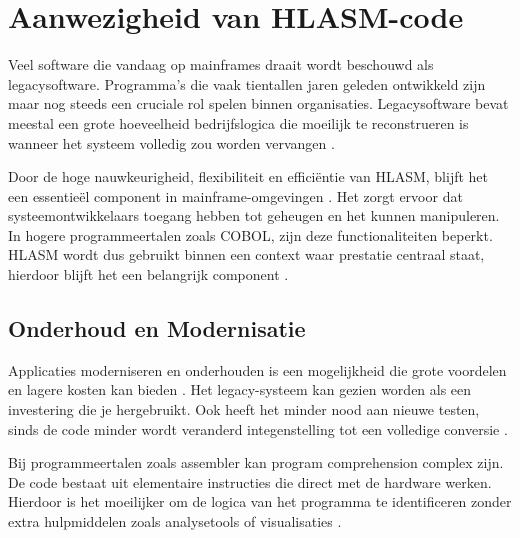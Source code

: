 

\section{Aanwezigheid van HLASM-code}

Veel software die vandaag op mainframes draait wordt beschouwd als legacysoftware. Programma's die vaak tientallen jaren geleden ontwikkeld zijn maar nog steeds een cruciale rol spelen binnen organisaties. Legacysoftware bevat meestal een grote hoeveelheid bedrijfslogica die moeilijk te reconstrueren is wanneer het systeem volledig zou worden vervangen \autocite{sneed_verhoef_2019}. 

Door de hoge nauwkeurigheid, flexibiliteit en efficiëntie van HLASM, blijft het een essentieël component in mainframe-omgevingen \autocite{yalamanchili_2022}. Het zorgt ervoor dat systeemontwikkelaars toegang hebben tot geheugen en het kunnen manipuleren. In hogere programmeertalen zoals COBOL, zijn deze functionaliteiten beperkt. HLASM wordt dus gebruikt binnen een context waar prestatie centraal staat, hierdoor blijft het een belangrijk component \autocite{yalamanchili_2022}. 


\subsection{Onderhoud en Modernisatie}

Applicaties moderniseren en onderhouden is een mogelijkheid die grote voordelen en lagere kosten kan bieden \autocite{ehrman_2004}. Het legacy-systeem kan gezien worden als een investering die je hergebruikt. Ook heeft het minder nood aan nieuwe testen, sinds de code minder wordt veranderd integenstelling tot een volledige conversie \autocite{ehrman_2004}.  

Bij programmeertalen zoals assembler kan program comprehension complex zijn. De code bestaat uit elementaire instructies die direct met de hardware werken. Hierdoor is het moeilijker om de logica van het programma te identificeren zonder extra hulpmiddelen zoals analysetools of visualisaties \autocite{baldwin_myers_storey_coady_2009}.

